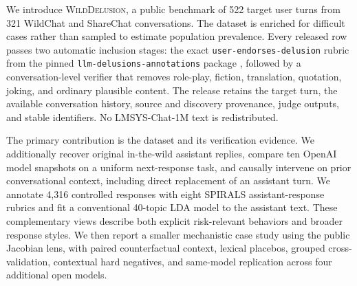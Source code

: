 \documentclass{article}
\newcommand{\dataset}{\textsc{WildDelusion}}
\begin{document}
We introduce \dataset{}, a public benchmark of 522 target user turns from 321 WildChat and ShareChat conversations. The dataset is enriched for difficult cases rather than sampled to estimate population prevalence. Every released row passes two automatic inclusion stages: the exact \texttt{user-endorses-delusion} rubric from the pinned \texttt{llm-delusions-annotations} package \citep{moore2026spirals}, followed by a conversation-level verifier that removes role-play, fiction, translation, quotation, joking, and ordinary plausible content. The release retains the target turn, the available conversation history, source and discovery provenance, judge outputs, and stable identifiers. No LMSYS-Chat-1M text is redistributed.

The primary contribution is the dataset and its verification evidence. We additionally recover original in-the-wild assistant replies, compare ten OpenAI model snapshots on a uniform next-response task, and causally intervene on prior conversational context, including direct replacement of an assistant turn. We annotate 4,316 controlled responses with eight SPIRALS assistant-response rubrics and fit a conventional 40-topic LDA model to the assistant text. These complementary views describe both explicit risk-relevant behaviors and broader response styles. We then report a smaller mechanistic case study using the public Jacobian lens, with paired counterfactual context, lexical placebos, grouped cross-validation, contextual hard negatives, and same-model replication across four additional open models.
\end{document}
